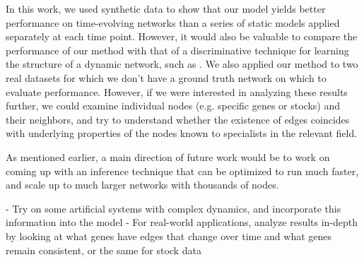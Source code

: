 \documentclass{article}
\begin{document}
In this work, we used synthetic data to show that our model yields better performance on time-evolving networks than a series of static models applied separately at each time point. However, it would also be valuable to compare the performance of our method with that of a discriminative technique for learning the structure of a dynamic network, such as \cite{song2009keller}. We also applied our method to two real datasets for which we don't have a ground truth network on which to evaluate performance. However, if we were interested in analyzing these results further, we could examine individual nodes (e.g. specific genes or stocks) and their neighbors, and try to understand whether the existence of edges coincides with underlying properties of the nodes known to specialists in the relevant field. 



As mentioned earlier, a main direction of future work would be to work on coming up with an inference technique that can be optimized to run much faster, and scale up to much larger networks with thousands of nodes. 

- Try on some artificial systems with complex dynamics, and incorporate this information into the model
- For real-world applications, analyze results in-depth by looking at what genes have edges that change over time and what genes remain consistent, or the same for stock data



\begin{small}

 

\end{small}
\end{document}
